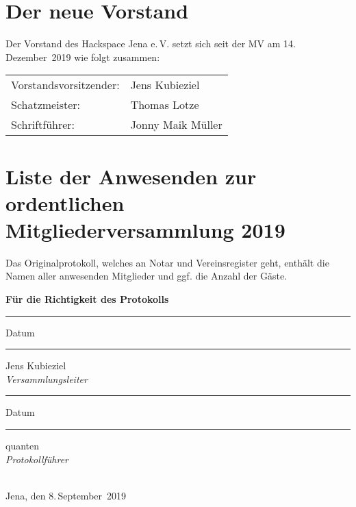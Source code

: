 \documentclass[DIV=calc,parksip=half*]{scrartcl}
\newcommand{\qbi}{Jens Kubieziel}
\newcommand{\jonny}{Jonny Maik Müller}
\newcommand{\thomas}{Thomas Lotze}
\newcommand{\quanten}{quanten}
\begin{document}

\clearpage{}
\section*{Der neue Vorstand}
Der Vorstand des Hackspace Jena e.\,V. setzt sich seit der MV am 14.\,De\-zem\-ber~2019
wie folgt zusammen:


\begin{tabularx}{\textwidth}{lX}
  Vorstandsvorsitzender: & \qbi{} \\
  Schatzmeister: & \thomas{} \\
  Schriftführer: & \jonny{}\\
\end{tabularx}

\section*{Liste der Anwesenden zur ordentlichen Mitgliederversammlung 2019}


Das Originalprotokoll, welches an Notar und Vereinsregister geht, enthält die
Namen aller anwesenden Mitglieder und ggf. die Anzahl der Gäste.


\vspace{10mm}
\textbf{\textsf{\large{Für die Richtigkeit des Protokolls}}} \\[2mm]
\hfill
\begin{minipage}[t]{20mm}
\vspace{22mm}
\hrule
\vspace{2mm}
\small{Datum}
\end{minipage}
\begin{minipage}[t]{40mm}
\vspace{22mm}
\hrule
\vspace{2mm}
\small{\qbi{}\\\textsl{Versammlungsleiter}}
\end{minipage}
\hfill
\begin{minipage}[t]{20mm}
\vspace{22mm}
\hrule
\vspace{2mm}
\small{Datum}
\end{minipage}
\begin{minipage}[t]{40mm}
\vspace{22mm}
\hrule
\vspace{2mm}
\small{\quanten{}\\\textsl{Protokollführer}}
\end{minipage}
\hfill
\\[8mm]
Jena, den 8.\,September~2019
\end{document}
